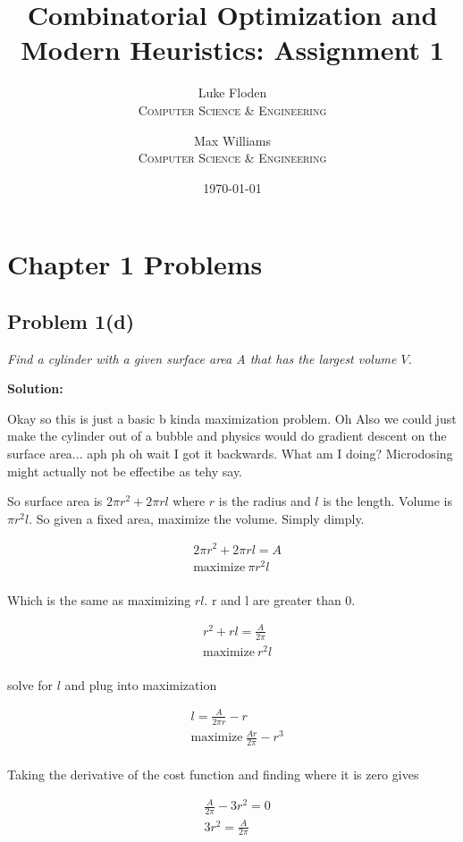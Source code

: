 \documentclass[11pt, a4paper]{article}
\title{Combinatorial Optimization and Modern Heuristics: Assignment 1}
\author{Luke Floden\\
    \textsc{Computer Science \& Engineering}\\
	\and 
	Max Williams\\
    \textsc{Computer Science \& Engineering}\\
	}
\date{\today}
\newcommand{\solution}{ \noindent \textbf{Solution:}}
\newcommand{\problem}[1]{\textit{#1} \medskip}
\begin{document}
\maketitle

\section*{Chapter 1 Problems}

\subsection*{Problem 1(d)}

\problem{Find a cylinder with a given surface area A that has the largest volume $V$.}

\solution

Okay so this is just a basic b kinda maximization problem. Oh Also we could just make the cylinder
out of a bubble and physics would do gradient descent on the surface area... aph ph oh wait I got it
backwards. What am I doing? Microdosing might actually not be effectibe as tehy say.

So surface area is $2 \pi r^2 + 2 \pi r l$ where $r$ is the radius and $l$ is the length. Volume is
$ \pi r^2 l$. So given a fixed area, maximize the volume. Simply dimply.

\begin{align*}
    &2 \pi r^2 + 2 \pi r l = A\\
    &\text{maximize}\ \pi r^2 l\\
\end{align*}

Which is the same as maximizing $rl$. r and l are greater than 0. 

\begin{align*}
    &r^2 + r l = \frac{A}{2 \pi}\\
    &\text{maximize}\ r^2 l\\
\end{align*}

solve for $l$ and plug into maximization

\begin{align*}
    & l = \frac{A}{2 \pi r} - r\\
    &\text{maximize}\ \frac{Ar}{2 \pi} - r^3\\
\end{align*}

Taking the derivative of the cost function and finding where it is zero gives

\begin{align*}
    &\frac{A}{2 \pi} - 3r^2 = 0\\
    & 3r^2 = \frac{A}{2 \pi}\\
\end{align*}
\end{document}
